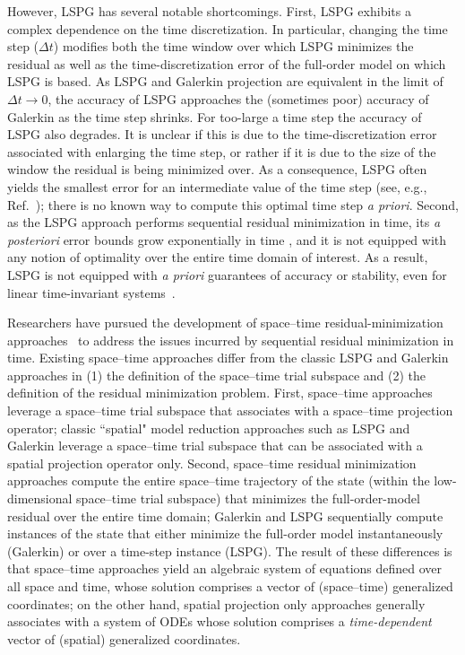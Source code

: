 \documentclass[3p,computermodern,10pt]{elsarticle}
\begin{document}
However, LSPG has several notable shortcomings. First, LSPG
exhibits a complex dependence on the time discretization. In
particular, changing
the time step ($\Delta t$) modifies both the
time window over which LSPG minimizes the residual as well as the
time-discretization error of the full-order model on which LSPG is based. 
As LSPG and Galerkin projection are equivalent in the
limit of $\Delta t \rightarrow 0$, the accuracy of LSPG approaches the (sometimes poor)
accuracy of Galerkin as the time step shrinks.
For too-large a time step the accuracy of LSPG also degrades. It is unclear if this is due to the time-discretization error associated with enlarging the time step, or rather if it is due to the size of the window the residual is being minimized over.
As a
consequence, LSPG often yields the smallest error for an intermediate value of the
time step (see, e.g., Ref.~\cite[Figure 9]{carlberg_lspg_v_galerkin}); there
is no known way to compute this optimal time step \textit{a priori}.
Second, as the LSPG approach performs sequential residual minimization in
time, its \textit{a posteriori} error bounds grow exponentially in time
\cite{carlberg_lspg_v_galerkin}, and it is not equipped with any notion of
optimality over the entire time domain of interest. As a result, LSPG is not
equipped with \textit{a priori} guarantees of accuracy or stability, even for
linear time-invariant systems~\cite{bui_thesis}.

Researchers have pursued the development of space--time
residual-minimization approaches~\cite{choi_stlspg,constantine_strom,URBAN2012203,Yano2014ASC} to
address the issues incurred by sequential residual minimization in time.
Existing space--time approaches differ from the classic LSPG and Galerkin approaches in (1) the definition of the space--time trial subspace and (2) the definition of the residual minimization problem. First, space--time approaches leverage a space--time trial 
subspace that associates with a space--time projection operator; classic ``spatial" model reduction approaches such as LSPG and Galerkin leverage a space--time trial subspace that can be associated with a spatial projection operator only. Second, space--time residual minimization approaches compute the entire space--time trajectory of the state (within the low-dimensional space--time trial subspace) that minimizes the full-order-model residual over the entire time domain; Galerkin and LSPG sequentially compute instances of the state that either minimize the full-order model instantaneously (Galerkin) or over a time-step instance (LSPG). 
The result of these differences is that space--time approaches yield an algebraic system of equations defined
over all space and time, whose solution comprises a  vector of
(space--time) generalized coordinates; on the other hand, spatial projection only approaches 
generally associates with a system of ODEs whose solution
comprises a \textit{time-dependent} vector of (spatial) generalized
coordinates.
\end{document}

